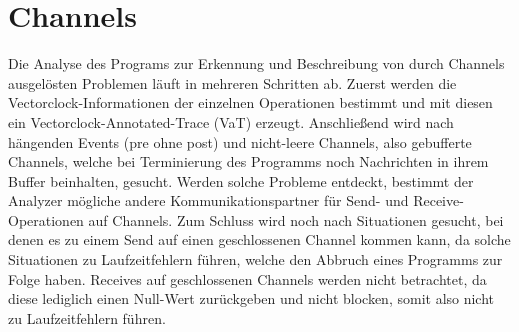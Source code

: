 \section{Channels}\label{Chap:Analyse-Sec:Channel}
Die Analyse des Programs zur Erkennung und Beschreibung von durch Channels ausgelösten 
Problemen läuft in mehreren Schritten ab. Zuerst werden die Vectorclock-Informationen 
der einzelnen Operationen bestimmt und mit diesen ein Vectorclock-Annotated-Trace 
(VaT) erzeugt. Anschließend wird nach hängenden Events (pre ohne post) und 
nicht-leere Channels, also gebufferte Channels, welche bei Terminierung 
des Programms noch Nachrichten in ihrem Buffer beinhalten, gesucht. 
Werden solche Probleme entdeckt, bestimmt der Analyzer mögliche andere 
Kommunikationspartner für Send- und Receive-Operationen auf Channels. Zum Schluss 
wird noch nach Situationen gesucht, bei denen es zu einem Send auf einen 
geschlossenen Channel kommen kann, da solche Situationen zu Laufzeitfehlern 
führen, welche den Abbruch eines Programms zur Folge haben.
Receives auf geschlossenen Channels werden nicht betrachtet, da diese 
lediglich einen Null-Wert zurückgeben und nicht blocken, somit also nicht 
zu Laufzeitfehlern führen. 

